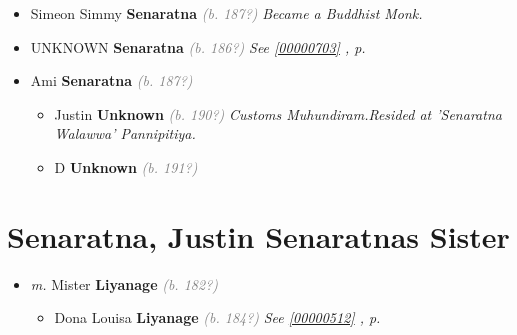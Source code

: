 \documentclass[10pt, openany]{book}
\begin{document}
\begin{itemize}
{\begin{itemize}
{  }
\item{Simeon Simmy \textbf{Senaratna} \textcolor{gray}{\textit{(b. 187?)}} \textcolor{slmaroon}{\textit{Became a Buddhist Monk.}}
  }
\item{UNKNOWN \textbf{Senaratna} \textcolor{gray}{\textit{(b. 186?)}} \textcolor{slteal}{\textit{See  \autoref{00000703} \textit{, p. \pageref{00000703} }}}}
\item{Ami \textbf{Senaratna} \textcolor{gray}{\textit{(b. 187?)}}
\begin{itemize}
\item{Justin \textbf{Unknown} \textcolor{gray}{\textit{(b. 190?)}} \textcolor{slmaroon}{\textit{Customs Muhundiram.Resided at 'Senaratna Walawwa' Pannipitiya.}}
 }
\item{D \textbf{Unknown} \textcolor{gray}{\textit{(b. 191?)}}
 }
\end{itemize}
 }
\end{itemize}}
\end{itemize}
 
\chapter{Senaratna, Justin Senaratnas Sister}
\label{00000736}
\textcolor{slmaroon}{\textit{}}
\begin{itemize}
\item{\textit{m.} Mister \textbf{Liyanage} \textcolor{gray}{\textit{(b. 182?)}}   \label{couple:00000513:00000736} \begin{itemize}
\item{Dona Louisa \textbf{Liyanage} \textcolor{gray}{\textit{(b. 184?)}} \textcolor{slteal}{\textit{See  \autoref{00000512} \textit{, p. \pageref{00000512} }}}}
\end{itemize}}
\end{itemize}
   
\end{document}
